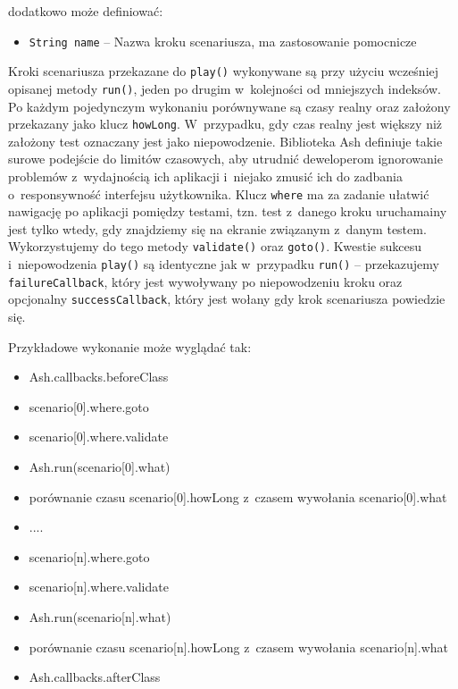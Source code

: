 \documentclass[brudnopis]{xmgr}
\begin{document}
dodatkowo może definiować:

\begin{itemize} 
  \item \texttt{String name} -- Nazwa kroku scenariusza, ma zastosowanie pomocnicze
\end{itemize}

Kroki scenariusza przekazane do \texttt{play()} wykonywane są przy użyciu wcześniej opisanej metody \texttt{run()}, jeden po drugim w~kolejności od mniejszych indeksów. Po każdym pojedynczym wykonaniu porównywane są czasy realny oraz założony przekazany jako klucz \texttt{howLong}. W~przypadku, gdy czas realny jest większy niż założony test oznaczany jest jako niepowodzenie. Biblioteka Ash definiuje takie surowe podejście do limitów czasowych, aby utrudnić deweloperom ignorowanie problemów z~wydajnością ich aplikacji i~niejako zmusić ich do zadbania o~responsywność interfejsu użytkownika. Klucz \texttt{where} ma za zadanie ułatwić nawigację po aplikacji pomiędzy testami, tzn. test z~danego kroku uruchamainy jest tylko wtedy, gdy znajdziemy się na ekranie związanym z~danym testem. Wykorzystujemy do tego metody \texttt{validate()} oraz \texttt{goto()}. Kwestie sukcesu i~niepowodzenia \texttt{play()} są identyczne jak w~przypadku \texttt{run()} -- przekazujemy \texttt{failureCallback}, który jest wywoływany po niepowodzeniu kroku oraz opcjonalny \texttt{successCallback},  który jest wołany gdy krok scenariusza powiedzie się. 

Przykładowe wykonanie może wyglądać tak:

\begin{itemize}
  \item Ash.callbacks.beforeClass
  \item scenario[0].where.goto
  \item scenario[0].where.validate
  \item Ash.run(scenario[0].what)
  \item porównanie czasu scenario[0].howLong z~czasem wywołania scenario[0].what
  \item ....
  \item scenario[n].where.goto
  \item scenario[n].where.validate
  \item Ash.run(scenario[n].what)
  \item porównanie czasu scenario[n].howLong z~czasem wywołania scenario[n].what
  \item Ash.callbacks.afterClass
\end{itemize}
\end{document}
